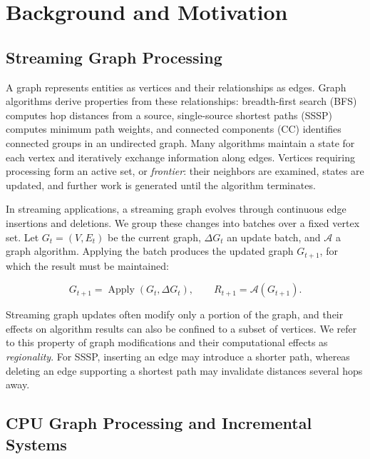 
\section{Background and Motivation}


\subsection{Streaming Graph Processing}


A graph represents entities as vertices and their relationships as edges. Graph algorithms derive properties from these relationships: breadth-first search (BFS) computes hop distances from a source, single-source shortest paths (SSSP) computes minimum path weights, and connected components (CC) identifies connected groups in an undirected graph. Many algorithms maintain a state for each vertex and iteratively exchange information along edges. Vertices requiring processing form an active set, or \emph{frontier}: their neighbors are examined, states are updated, and further work is generated until the algorithm terminates.

In streaming applications, a streaming graph evolves through continuous edge insertions and deletions. We group these changes into batches over a fixed vertex set. Let $G_t=(V,E_t)$ be the current graph, $\Delta G_t$ an update batch, and $\mathcal A$ a graph algorithm. Applying the batch produces the updated graph $G_{t+1}$, for which the result must be maintained:

\begin{equation}
G_{t+1}=\operatorname{Apply}(G_t,\Delta G_t),
\qquad R_{t+1}=\mathcal A(G_{t+1}).
\end{equation}

Streaming graph updates often modify only a portion of the graph, and their effects on algorithm results can also be confined to a subset of vertices. We refer to this property of graph modifications and their computational effects as \emph{regionality}. For SSSP, inserting an edge may introduce a shorter path, whereas deleting an edge supporting a shortest path may invalidate distances several hops away.

\subsection{CPU Graph Processing and Incremental Systems}


